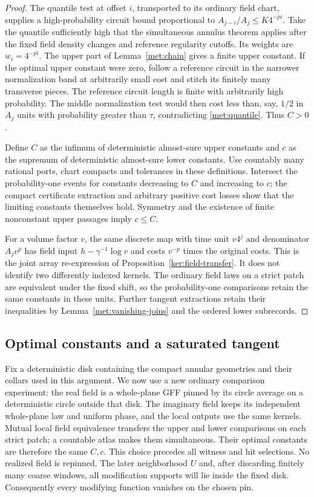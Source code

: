 \begin{proof}
The quantile test at offset $i$, transported to its ordinary field
chart, supplies a high-probability circuit bound proportional to
$A_{j-i}/A_j\leq K4^{-pi}$.  Take the quantile sufficiently high that
the simultaneous annulus theorem applies after the fixed field
density changes and reference regularity cutoffs.  Its weights are
$w_i=4^{-pi}$.  The upper part of Lemma~\ref{met:chain} gives a finite
upper constant.  If the optimal upper constant were zero, follow a
reference circuit in the narrower normalization band at arbitrarily
small cost and stitch its finitely many transverse pieces.  The
reference circuit length is finite with arbitrarily high probability.
The middle normalization test would then cost less than, say, $1/2$
in $A_j$ units with probability greater than $\tau$, contradicting
\eqref{met:quantile}.  Thus $C>0$.

Define $C$ as the infimum of deterministic almost-sure upper constants
and $c$ as the supremum of deterministic almost-sure lower constants.
Use countably many rational ports, chart compacts and tolerances in
these definitions.  Intersect the probability-one events for constants
decreasing to $C$ and increasing to $c$; the compact certificate
extraction and arbitrary positive cost losses show that the limiting
constants themselves hold.  Symmetry and the existence of finite
nonconstant upper passages imply $c\leq C$.

For a volume factor $v$, the same discrete map with time unit $v4^j$
and denominator $A_jv^p$ has field input
$h-\gamma^{-1}\log v$ and costs $v^{-p}$ times the original costs.
This is the joint array re-expression of
Proposition~\ref{ker:field-transfer}.  It does not identify two differently
indexed kernels.  The ordinary field laws on a strict patch are
equivalent under the fixed shift, so the probability-one comparisons
retain the same constants in these units.  Further tangent
extractions retain their inequalities by
Lemma~\ref{met:vanishing-joins} and the ordered lower subrecords.
\end{proof}

\subsection{Optimal constants and a saturated tangent}

Fix a deterministic disk containing the compact annular geometries
and their collars used in this argument.  We now use a new ordinary
comparison experiment: the real field is a whole-plane GFF pinned by
its circle average on a deterministic circle outside that disk.  The
imaginary field keeps its independent whole-plane law and uniform
phase, and the local outputs use the same kernels.  Mutual local
field equivalence transfers the upper and lower comparisons on each
strict patch; a countable atlas makes them simultaneous.  Their
optimal constants are therefore the same $C,c$.  This choice precedes
all witness and hit selections.  No realized field is repinned.
The later neighborhood $U$ and, after discarding finitely many coarse
windows, all modification supports will lie inside the fixed disk.
Consequently every modifying function vanishes on the chosen pin.

